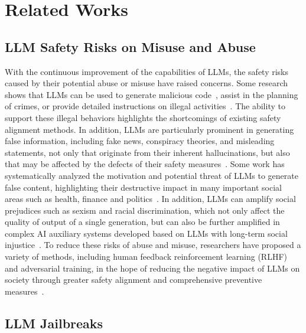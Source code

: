 \section{Related Works}

\subsection*{LLM Safety Risks on Misuse and Abuse}

With the continuous improvement of the capabilities of LLMs, the safety risks caused by their potential abuse or misuse have raised concerns. Some research shows that LLMs can be used to generate malicious code~\cite{10431609}, assist in the planning of crimes, or provide detailed instructions on illegal activities~\cite{mozes2023use}. The ability to support these illegal behaviors highlights the shortcomings of existing safety alignment methods. In addition, LLMs are particularly prominent in generating false information, including fake news, conspiracy theories, and misleading statements, not only that originate from their inherent hallucinations, but also that may be affected by the defects of their safety measures~\cite{barman2024dark}. Some work has systematically analyzed the motivation and potential threat of LLMs to generate false content, highlighting their destructive impact in many important social areas such as health, finance and politics~\cite{pan2023risk, sun2024exploring, Papageorgiou2024}. In addition, LLMs can amplify social prejudices such as sexism and racial discrimination, which not only affect the quality of output of a single generation, but can also be further amplified in complex AI auxiliary systems developed based on LLMs with long-term social injustice~\cite{wan2023kelly, an2024measuring}. To reduce these risks of abuse and misuse, researchers have proposed a variety of methods, including human feedback reinforcement learning (RLHF) and adversarial training, in the hope of reducing the negative impact of LLMs on society through greater safety alignment and comprehensive preventive measures~\cite{ouyang2022training, xhonneux2024efficient}.

\subsection*{LLM Jailbreaks}

